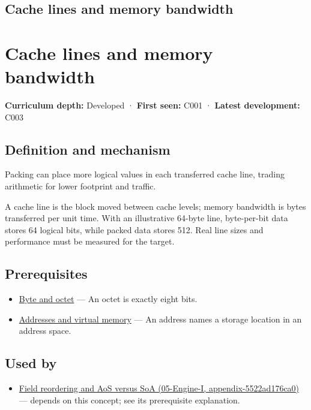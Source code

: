\hypertarget{appendix-e4ccdbab8320}{}
\section*{Cache lines and memory bandwidth}
\chapter{Cache lines and memory bandwidth}\label{appendix-e4ccdbab8320-cache-lines-and-memory-bandwidth}

\textbf{Curriculum depth:} Developed · \textbf{First seen:} C001 · \textbf{Latest development:} C003

\section{Definition and mechanism}\label{appendix-e4ccdbab8320-definition-and-mechanism}

Packing can place more logical values in each transferred cache line, trading arithmetic for lower footprint and traffic.

A cache line is the block moved between cache levels; memory bandwidth is bytes transferred per unit time. With an illustrative 64-byte line, byte-per-bit data stores 64 logical bits, while packed data stores 512. Real line sizes and performance must be measured for the target.

\section{Prerequisites}\label{appendix-e4ccdbab8320-prerequisites}

\begin{itemize}
\tightlist
\item
  \hyperref[appendix-5bee2df85484]{Byte and octet} --- An octet is exactly eight bits.
\item
  \hyperref[appendix-18ee4f913c3c]{Addresses and virtual memory} --- An address names a storage location in an address space.
\end{itemize}

\section{Used by}\label{appendix-e4ccdbab8320-used-by}

\begin{itemize}
\tightlist
\item
  \href{../05-Engine-I/main.pdf\#nameddest=appendix-5522ad176ca0}{Field reordering and AoS versus SoA (05-Engine-I, appendix-5522ad176ca0)} --- depends on this concept; see its prerequisite explanation.
\end{itemize}


